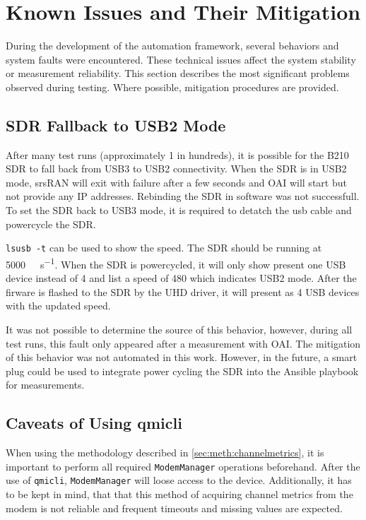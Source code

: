 \section{Known Issues and Their Mitigation}\label{sec:meth:issues}

During the development of the automation framework, several behaviors and system faults were encountered.
These technical issues affect the system stability or measurement reliability.
This section describes the most significant problems observed during testing.
Where possible, mitigation procedures are provided.

\subsection{\gls{SDR} Fallback to USB2 Mode}

After many test runs (approximately 1 in hundreds), it is possible for the B210 \gls{SDR} to fall back
from USB3 to USB2 connectivity.
When the \gls{SDR} is in USB2 mode, srsRAN will exit with failure after a few seconds and OAI
will start but not provide any IP addresses.
Rebinding the \gls{SDR} in software was not successfull.
To set the \gls{SDR} back to USB3 mode, it is required to detatch the usb cable and powercycle the \gls{SDR}.

\texttt{lsusb -t} can be used to show the speed.
The \gls{SDR} should be running at \SI{5000}{\mega\byte\per\second}.
When the \gls{SDR} is powercycled, it will only show present one USB device instead of 4 and list a speed of 480 which indicates USB2 mode.
After the firware is flashed to the \gls{SDR} by the \gls{UHD} driver, it will present as 4 USB devices with the updated speed.

It was not possible to determine the source of this behavior, however, during all test runs, this fault only appeared
after a measurement with OAI.
The mitigation of this behavior was not automated in this work.
However, in the future, a smart plug could be used to integrate power cycling the \gls{SDR} into the Ansible playbook for measurements.


\subsection{Caveats of Using qmicli}\label{sec:meth:issueqmi}

When using the methodology described in \ref{sec:meth:channelmetrics}, it is important to
perform all required \texttt{ModemManager} operations beforehand.
After the use of \texttt{qmicli}, \texttt{ModemManager} will loose access to the device.
Additionally, it has to be kept in mind, that that this method of acquiring channel metrics from the modem is not
reliable and frequent timeouts and missing values are expected.

